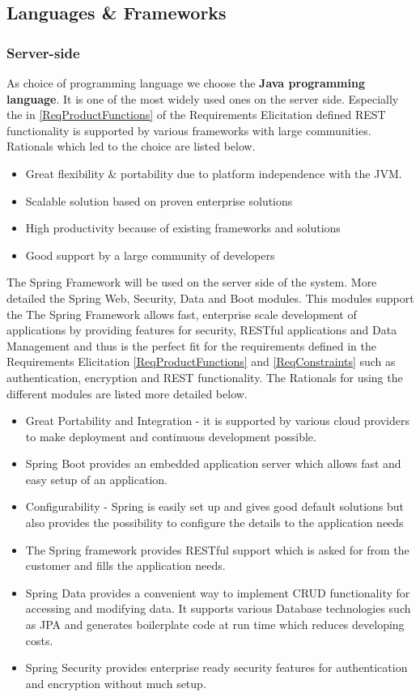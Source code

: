\documentclass[a4paper,11pt]{article}
\begin{document}
\subsection{Languages \& Frameworks}
\subsubsection{Server-side}
As choice of programming language we choose the \textbf{Java programming language}. It is one of the most widely used ones on the server side. Especially the  in \ref{ReqProductFunctions} of the Requirements Elicitation defined REST functionality is supported by various frameworks with large communities. Rationals which led to the choice are listed below.
\begin{itemize}
\item Great flexibility \& portability due to platform independence with the JVM.
\item Scalable solution based on proven enterprise solutions
\item High productivity because of existing frameworks and solutions
\item Good support by a large community of developers
\end{itemize}

The Spring Framework will be used on the server side of the system.
More detailed the Spring Web, Security, Data and Boot modules. This modules support the 
The Spring Framework allows fast, enterprise scale development of applications by providing features for security, RESTful applications and Data Management and thus is the perfect fit for the requirements defined in the Requirements Elicitation \ref{ReqProductFunctions} and \ref{ReqConstraints} such as authentication, encryption and REST functionality. The Rationals for using the different modules are listed more detailed below.
\begin{itemize}
\item Great Portability and Integration - it is supported by various cloud providers to make deployment and continuous development possible.
\item Spring Boot provides an embedded application server which allows fast and easy setup of an application.
\item Configurability - Spring is easily set up and gives good default solutions but also provides the possibility to configure the details to the application needs
\item The Spring framework provides RESTful support which is asked for from the customer and fills the application needs.
\item Spring Data provides a convenient way to implement CRUD functionality for accessing and modifying data. It supports various Database technologies such as JPA and generates boilerplate code at run time which reduces developing costs.
\item Spring Security provides enterprise ready security features for authentication and encryption without much setup.
\end{itemize}
\end{document}
